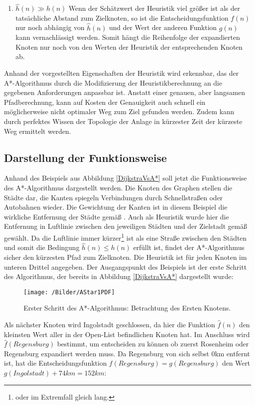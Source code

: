 \begin{enumerate}
			\item \textbf{$\hat{h}(n)\gg h(n)$} Wenn der Schätzwert der Heuristik viel größer ist als der tatsächliche Abstand zum Zielknoten, so ist die Entscheidungsfunktion $f(n)$ nur noch abhängig von $\hat{h}(n)$ und der Wert der anderen Funktion $g(n)$ kann vernachlässigt werden. Somit hängt die Reihenfolge der expandierten Knoten nur noch von den Werten der Heuristik der entsprechenden Knoten ab.
		\end{enumerate}
		 
		Anhand der vorgestellten Eigenschaften der Heuristik wird erkennbar, das der A*-Algorithmus durch die Modifizierung der Heuristikberechnung an die gegebenen Anforderungen anpassbar ist. Anstatt einer genauen, aber langsamen Pfadberechnung, kann auf Kosten der Genauigkeit auch schnell ein möglicherweise nicht optimaler Weg zum Ziel gefunden werden. Zudem kann durch perfektes Wissen der Topologie der Anlage in kürzester Zeit der kürzeste Weg ermittelt werden.
	
	\subsection{Darstellung der Funktionsweise}
		Anhand des Beispiels aus Abbildung \ref{DijkstraVsA*} soll jetzt die Funktionsweise des A*-Algorithmus dargestellt werden. Die Knoten des Graphen stellen die Städte dar, die Kanten spiegeln Verbindungen  durch Schnellstraßen oder Autobahnen wieder. Die Gewichtung der Kanten ist in diesem Beispiel die wirkliche Entfernung der Städte gemäß \cite{Luftlinie}. Auch als Heuristik wurde hier die Entfernung in Luftlinie zwischen den jeweiligen Städten und der Zielstadt gemäß \cite{Luftlinie} gewählt. Da die Luftlinie immer kürzer\footnote{oder im Extremfall gleich lang.} ist als eine Straße zwischen den Städten und somit die Bedingung $\hat{h}(n)\le h(n)$ erfüllt ist, findet der A*-Algorithmus sicher den kürzesten Pfad zum Zielknoten. Die Heuristik ist für jeden Knoten im unteren Drittel  angegeben. Der Ausgangspunkt des Beispiels ist der erste Schritt des Algorithmus, der bereits in Abbildung \ref{DijkstraVsA*} dargestellt wurde:  
		
		\begin{figure}[H]
			\centering
			\texttt{[image: /Bilder/AStar1PDF]}
			\vspace{0.2cm}
			\caption{Erster Schritt des A*-Algorithmus: Betrachtung des Ersten Knotens.}
		\end{figure}
		
		Als nächster Knoten wird Ingolstadt geschlossen, da hier die Funktion $\hat{f}(n)$ den kleinsten Wert aller in der Open-List befindlichen Knoten hat. Im Anschluss wird $\hat{f}(Regensburg)$ bestimmt, um entscheiden zu können ob zuerst Rosenheim oder Regensburg expandiert werden muss. Da Regensburg von sich selbst 0km entfernt ist, hat die Entscheidungsfunktion $f(Regensburg)=g(Regensburg)$ den Wert $g(Ingolstadt)+74km=152km$:
		
